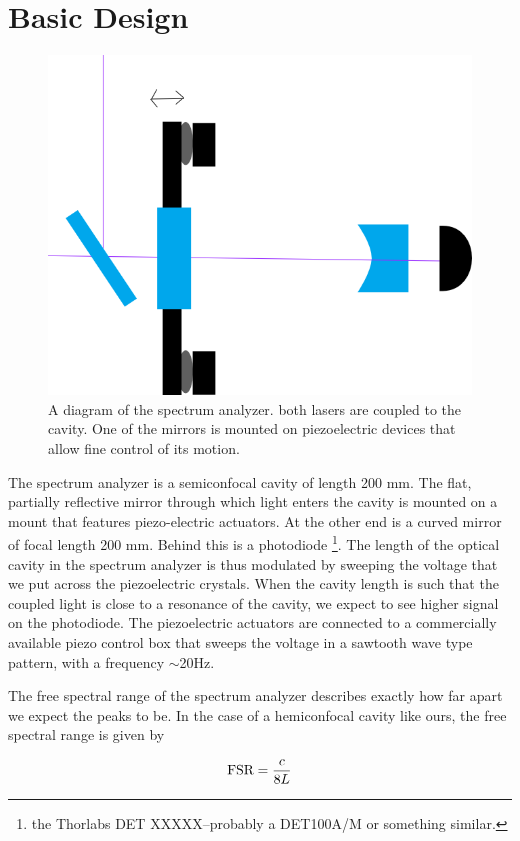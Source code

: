 \section{Basic Design}
\begin{figure}
    \centerline{\includegraphics[totalheight=0.3\textheight ]{spectrumAnalyzer}}
    \caption[]{\label{fig:spectrumAnalyzer}
    A diagram of the spectrum analyzer. both lasers are coupled to the cavity. One of the mirrors is mounted on piezoelectric devices that allow fine control of its motion. 
}
\end{figure} 

The spectrum analyzer is a semiconfocal cavity of length 200 mm. The flat, partially reflective mirror through which light enters the cavity is mounted on a mount that features piezo-electric actuators. At the other end is a curved mirror of focal length 200 mm. Behind this is a photodiode \footnote{the Thorlabs DET XXXXX--probably a DET100A/M or something similar.}.
The length of the optical cavity in the spectrum analyzer is thus modulated by sweeping the voltage that we put across the piezoelectric crystals. When the cavity length is such that the coupled light is close to a resonance of the cavity, we expect to see higher signal on the photodiode. 
The piezoelectric actuators are connected to a commercially available piezo control box that sweeps the voltage in a sawtooth wave type pattern, with a frequency $\sim$20Hz. 

The free spectral range of the spectrum analyzer describes exactly how far apart we expect the peaks to be. In the case of a hemiconfocal cavity like ours, the free spectral range is given by 

\begin{equation}
    \textnormal{FSR}=\frac{c}{8L}
\end{equation}
